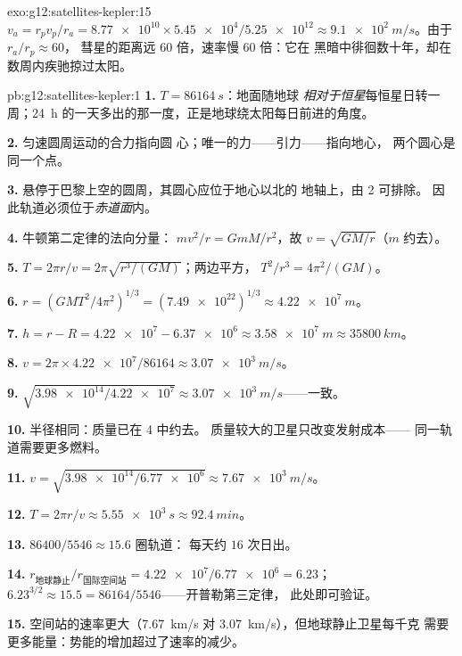 \begin{solution}{exo:g12:satellites-kepler:15}
$v_a = r_p v_p / r_a = \num{8.77e10} \times \num{5.45e4} /
\num{5.25e12} \approx \qty{9.1e2}{m/s}$。由于 $r_a/r_p \approx 60$，
彗星的距离远 $60$ 倍，速率慢 $60$ 倍：它在
黑暗中徘徊数十年，却在数周内疾驰掠过太阳。
\end{solution}

\begin{solution}{pb:g12:satellites-kepler:1}
\textbf{1.} $T = \qty{86164}{s}$：地面随地球
\emph{相对于恒星}每恒星日转一周；\qty{24}{h}
的一天多出的那一度，正是地球绕太阳每日前进的角度。

\textbf{2.} 匀速圆周运动的合力指向圆
心；唯一的力——引力——指向地心，
两个圆心是同一个点。

\textbf{3.} 悬停于巴黎上空的圆周，其圆心应位于地心以北的
地轴上，由 2 可排除。
因此轨道必须位于\emph{赤道面}内。

\textbf{4.} 牛顿第二定律的法向分量：
$m v^2/r = GmM/r^2$，故 $v = \sqrt{GM/r}$（$m$ 约去）。

\textbf{5.} $T = 2\pi r/v = 2\pi\sqrt{r^3/(GM)}$；两边平方，
$T^2/r^3 = 4\pi^2/(GM)$。

\textbf{6.} $r = \left(GMT^2/4\pi^2\right)^{1/3} =
(\num{7.49e22})^{1/3} \approx \qty{4.22e7}{m}$。

\textbf{7.} $h = r - R = \num{4.22e7} - \num{6.37e6} \approx
\qty{3.58e7}{m} \approx \qty{35800}{km}$。

\textbf{8.} $v = 2\pi \times \num{4.22e7}/\num{86164} \approx
\qty{3.07e3}{m/s}$。

\textbf{9.} $\sqrt{\num{3.98e14}/\num{4.22e7}} \approx
\qty{3.07e3}{m/s}$——一致。

\textbf{10.} 半径相同：质量已在 4 中约去。
质量较大的卫星只改变发射成本——
同一轨道需要更多燃料。

\textbf{11.} $v = \sqrt{\num{3.98e14}/\num{6.77e6}} \approx
\qty{7.67e3}{m/s}$。

\textbf{12.} $T = 2\pi r/v \approx \qty{5.55e3}{s} \approx
\qty{92.4}{min}$。

\textbf{13.} $\num{86400}/5546 \approx 15.6$ 圈轨道：
每天约 $16$ 次日出。

\textbf{14.} $r_{\text{地球静止}}/r_{\text{国际空间站}} = \num{4.22e7}/\num{6.77e6}
= 6.23$；$6.23^{3/2} \approx 15.5 = \num{86164}/5546$——开普勒第三定律，
此处即可验证。

\textbf{15.} 空间站的速率更大（\qty{7.67}{km/s}
对 \qty{3.07}{km/s}），但地球静止卫星每千克
需要更多能量：势能的增加超过了速率的减少。


\end{solution}
